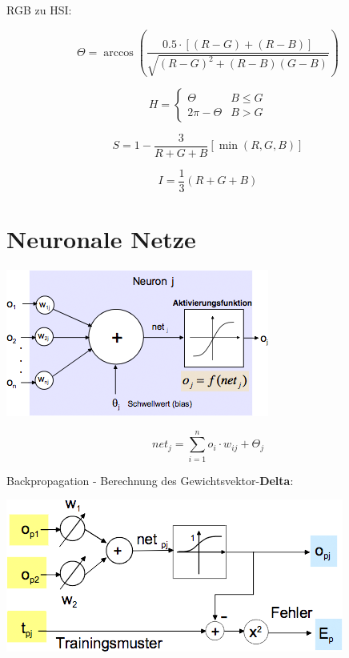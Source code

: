 RGB zu HSI:

\begin{scriptsize}
\[
	\Theta = \arccos \left (
		\frac{
			0.5 \cdot [(R-G)+(R-B)]
		}
		{
			\sqrt{(R-G)^2 + (R-B) (G-B)}
		}
	\right )
\]
\end{scriptsize}

\[
	H = \begin{cases}
		\Theta & B \leq G \\
		2\pi - \Theta & B > G

	\end{cases}
\]

\[
	S = 1 - \frac{3}{R+G+B}[\min(R,G,B)]
\]

\[
	I = \frac{1}{3}(R+G+B)
\]








\section{Neuronale Netze}

\includegraphics[width=1.1\linewidth]{images/neuron.png}

\[
	net_j = \sum_{i=1}^n o_i \cdot w_{ij} + \Theta_j
\]

Backpropagation - Berechnung des Gewichtsvektor-\textbf{Delta}:

\includegraphics[width=1.1\linewidth]{images/backpropagation.png}

